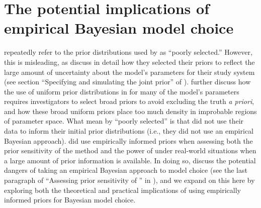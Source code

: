 \section*{The potential implications of empirical Bayesian model choice}
\citet{Hickerson2013} repeatedly refer to the prior distributions used by
\citet{Oaks2012} as ``poorly selected.''
However, this is misleading, as \citet{Oaks2012} discuss in detail how they
selected their priors to reflect the large amount of uncertainty about the
model's parameters for their study system (see section ``Specifying and
simulating the joint prior'' of \citet{Oaks2012}).
\citet{Oaks2012} further discuss how the use of uniform prior distributions in
\msb for many of the model's parameters requires investigators to select broad
priors to avoid excluding the truth \textit{a priori}, and how these broad
uniform priors place too much density in improbable regions of parameter space.
What \citet{Hickerson2013} mean by ``poorly selected'' is that
\citet{Oaks2012} did not use their data to inform their initial prior
distributions (i.e., they did not use an empirical Bayesian approach).
\citet{Oaks2012} did use empirically informed priors when assessing both the
prior sensitivity of the method and the power of \msb under real-world
situations when a large amount of prior information is available. 
In doing so, \citet{Oaks2012} discuss the potential dangers of taking an
empirical Bayesian approach to model choice (see the last paragraph of
``Assessing prior sensitivity of \msb'' in \citet{Oaks2012}), and we expand on
this here by exploring both the theoretical and practical implications of using
empirically informed priors for Bayesian model choice.

